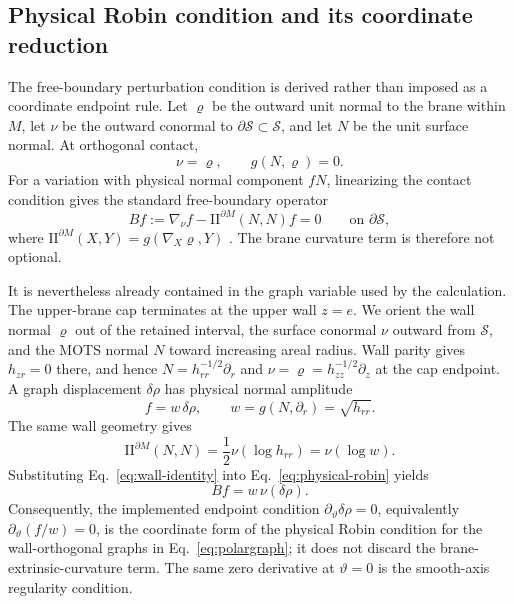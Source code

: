 \documentclass[11pt]{article}
\newcommand{\II}{\mathrm{II}}
\begin{document}
\subsection{Physical Robin condition and its coordinate reduction}

The free-boundary perturbation condition is derived rather than imposed as a
coordinate endpoint rule.  Let $\varrho$ be the outward unit normal to the
brane within $M$, let $\nu$ be the outward conormal to
$\partial\mathcal S\subset\mathcal S$, and let $N$ be the unit surface normal.
At orthogonal contact,
\begin{equation}
\nu=\varrho,\qquad g(N,\varrho)=0.
\end{equation}
For a variation with physical normal component $fN$, linearizing the contact
condition gives the standard free-boundary operator
\begin{equation}
Bf:=\nabla_\nu f-\II^{\partial M}(N,N)f=0
\qquad\text{on }\partial\mathcal S,
\label{eq:physical-robin}
\end{equation}
where
$\II^{\partial M}(X,Y)=g(\nabla_X\varrho,Y)$
\cite{AlaeeLesourdYau2020,Mendes2021}.  The brane curvature term is therefore
not optional.

It is nevertheless already contained in the graph variable used by the
calculation.  The upper-brane cap terminates at the upper wall $z=e$.  We orient the
wall normal $\varrho$ out of the retained interval, the surface conormal $\nu$
outward from $\mathcal S$, and the MOTS normal $N$ toward increasing areal
radius.  Wall parity gives $h_{zr}=0$ there, and hence
$N=h_{rr}^{-1/2}\partial_r$ and
$\nu=\varrho=h_{zz}^{-1/2}\partial_z$ at the cap endpoint.
A graph displacement $\delta\rho$ has physical normal amplitude
\begin{equation}
f=w\,\delta\rho,
\qquad w=g(N,\partial_r)=\sqrt{h_{rr}}.
\end{equation}
The same wall geometry gives
\begin{equation}
\II^{\partial M}(N,N)
=\frac12\nu(\log h_{rr})=\nu(\log w).
\label{eq:wall-identity}
\end{equation}
Substituting Eq.~\eqref{eq:wall-identity} into
Eq.~\eqref{eq:physical-robin} yields
\begin{equation}
Bf=w\,\nu(\delta\rho).
\end{equation}
Consequently, the implemented endpoint condition
$\partial_\vartheta\delta\rho=0$, equivalently
$\partial_\vartheta(f/w)=0$, is the coordinate form of the physical Robin
condition for the wall-orthogonal graphs in Eq.~\eqref{eq:polargraph}; it does
not discard the brane-extrinsic-curvature term.  The same zero derivative at
$\vartheta=0$ is the smooth-axis regularity condition.
\end{document}

